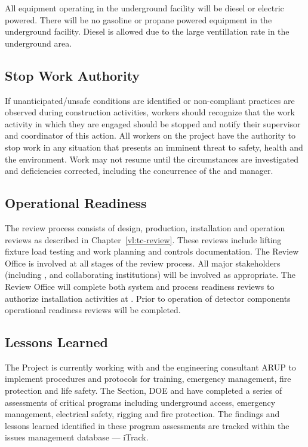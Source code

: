 All equipment operating in the underground facility will be diesel or
electric powered. There will be no gasoline or propane powered
equipment in the underground facility. Diesel is allowed due to the large
ventillation rate in the underground area.

\subsection{Stop Work Authority}

If unanticipated/unsafe conditions are identified or non-compliant
practices are observed during construction activities, workers should
recognize that the work activity in which they are engaged should be
stopped and notify their supervisor and   coordinator of
this action. All workers on the  project have the
authority to stop work in any situation that presents an imminent
threat to safety, health and the environment. Work may not resume
until the circumstances are investigated and deficiencies corrected,
including the concurrence of the  
and   manager.

\subsection{Operational Readiness}

The  review process consists of design, production,
installation and operation reviews as described in
Chapter~\ref{vl:tc-review}. These reviews include lifting fixture
load testing and work planning and controls documentation. The
 Review Office is involved at all stages of the review
process. All major stakeholders (including \fnal,  and
 collaborating institutions) will be involved as
appropriate. The Review Office will complete both system and process
readiness reviews to authorize installation activities at
.  Prior to operation of detector components operational
readiness reviews will be completed.

\subsection{Lessons Learned}

The  Project is currently working with  and the 
engineering consultant ARUP to implement  procedures and
protocols for training, emergency management, fire
protection and life safety. The \fnal {} Section, DOE and
  have completed a series of assessments of
critical   programs including underground access,
emergency management, electrical safety, rigging and fire
protection. The findings and lessons learned identified in these
 program assessments are tracked within the \fnal issues management
database --- iTrack.

